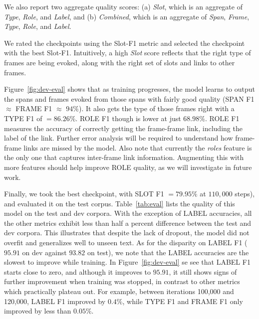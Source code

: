 \documentclass[11pt,a4paper]{article}
\begin{document}
We also report two aggregate quality scores: (a) {\em Slot}, which is
an aggregate of {\em Type}, {\em Role}, and {\em Label}, and (b) {\em Combined},
which is an aggregate of {\em Span}, {\em Frame}, {\em Type}, {\em Role}, and
{\em Label}.

We rated the checkpoints using the Slot-F1 metric and selected the checkpoint with
the best Slot-F1. Intuitively, a high {\em Slot} score reflects that the
right type of frames are being evoked, along with the right set of slots and
links to other frames.

Figure~\ref{fig:dev-eval} shows that as training progresses,
the model learns to output the spans and frames evoked from those spans with
fairly good quality (SPAN F1 $\approx$ FRAME F1 $\approx$ $94\%$). It also
gets the type of those frames right with a TYPE F1 of $= 86.26\%$. ROLE F1
though is lower at just $68.98\%$. ROLE F1 measures the accuracy of correctly
getting the frame-frame link, including the label of the link. Further error
analysis will be required to understand how frame-frame links are missed by
the model. Also note that currently the {\em roles} feature is the only one
that captures inter-frame link information.
Augmenting this with more features should help improve ROLE quality, as we will
investigate in future work.

Finally, we took the best checkpoint, with SLOT F1 $= 79.95\%$ at $110,000$ steps),
and evaluated it on the test corpus.
Table~\ref{tab:eval} lists the quality of this model on the test and dev
corpora.
With the exception of LABEL accuracies, all the other metrics exhibit less than
half a percent difference between the test and dev corpora. This illustrates
that despite the lack of dropout, the model did not overfit and generalizes well
to unseen text.
As for the disparity on LABEL F1 ($95.91$ on dev
against $93.82$ on test), we note that the LABEL accuracies are the slowest to
improve while training.
In Figure~\ref{fig:dev-eval} se see that LABEL F1 starts close to zero,
and although it improves to $95.91$, it still shows signs of further improvement
when training was stopped, in contrast to other metrics which practically
plateau out.
For example, between iterations 100,000 and 120,000, LABEL F1 improved by
$0.4\%$, while TYPE F1 and FRAME F1 only improved by less than $0.05\%$.
\end{document}
